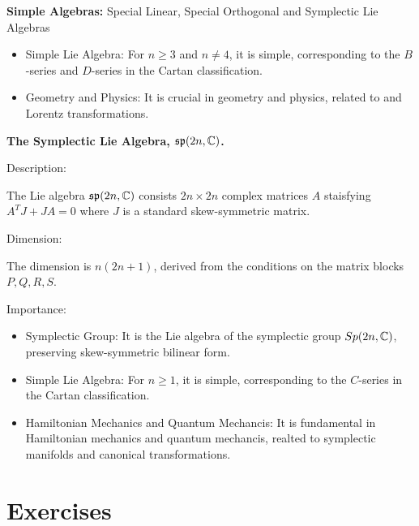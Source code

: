 \documentclass[12pt,a4paper]{report}
\begin{document}
\begin{remark}{\textbf{Simple Algebras:} Special Linear, Special Orthogonal and Symplectic Lie Algebras}
\begin{description}
\begin{itemize}
		\item Simple Lie Algebra: For $n\ge 3$ and $n \ne 4$, it is simple, corresponding to the $B$-series  and $D$-series in the Cartan classification.
		
		\item Geometry and Physics:  It is crucial in geometry and physics, related to  and Lorentz transformations.
	\end{itemize}
	
	\item \textbf{The Symplectic Lie Algebra, $\mathfrak{sp}(2n,\mathbb{C})$.}
	
	Description:
	
	The Lie algebra $\mathfrak{sp}(2n,\mathbb{C})$ consists $2n\times 2n$ complex matrices $A$ staisfying $A^TJ+JA = 0$ where $J$ is a standard skew-symmetric matrix.
	
	Dimension:
	
	The dimension is $n(2n+1)$, derived from the conditions on the matrix blocks $P,Q,R,S$.
	
	Importance:
	\begin{itemize}
		\item Symplectic Group:  It is the Lie algebra of the symplectic group $Sp(2n,\mathbb{C})$, preserving skew-symmetric bilinear form.
		\item Simple Lie Algebra: For $n\ge 1$, it is simple, corresponding to the $C$-series in the Cartan classification.
		
		\item Hamiltonian Mechanics and Quantum Mechancis:  It is fundamental in Hamiltonian mechanics and quantum mechancis, realted to symplectic manifolds and canonical transformations.
	\end{itemize}
\end{description}
\end{remark}
\section{Exercises}
\end{document}

